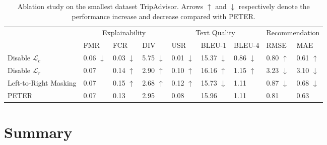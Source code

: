 \begin{sidewaystable}[!tbp]
	\caption[Ablation study on the smallest dataset TripAdvisor.]{Ablation study on the smallest dataset TripAdvisor. Arrows $\uparrow$ and $\downarrow$ respectively denote the performance increase and decrease compared with PETER.}
	\begin{center}
		\begin{tabular}{l|lll|lll|ll}
			\hline
			\multirow{2}{*}{} & \multicolumn{3}{c|}{Explainability} & \multicolumn{3}{c|}{Text Quality}  & \multicolumn{2}{c}{Recommendation} \\ \cline{2-9}
			& FMR & FCR & DIV & USR & BLEU-1 & BLEU-4 & RMSE & MAE \\ \hline		
			Disable $\mathcal{L}_c$ & 0.06 $\downarrow$ & 0.03 $\downarrow$ & 5.75 $\downarrow$ & 0.01 $\downarrow$ & 15.37 $\downarrow$ & 0.86 $\downarrow$ & 0.80 $\uparrow$ & 0.61 $\uparrow$ \\
			Disable $\mathcal{L}_r$ & 0.07 & 0.14 $\uparrow$ & 2.90 $\uparrow$ & 0.10 $\uparrow$ & 16.16 $\uparrow$ & 1.15 $\uparrow$ & 3.23 $\downarrow$ & 3.10 $\downarrow$ \\
			Left-to-Right Masking & 0.07 & 0.15 $\uparrow$ & 2.68 $\uparrow$ & 0.12 $\uparrow$ & 15.73 $\downarrow$ & 1.11 & 0.87 $\downarrow$ & 0.68 $\downarrow$ \\ \hline
			PETER & 0.07 & 0.13 & 2.95 & 0.08 & 15.96 & 1.11 & 0.81 & 0.63 \\ \hline
		\end{tabular}
	\end{center}
	\label{table3:ablation}
\end{sidewaystable}

\section{Summary}
